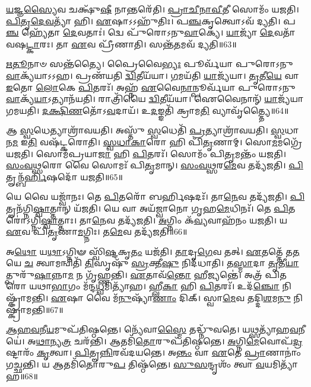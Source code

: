 \-\ul{𑌯}\-𑌜𑍍𑌞\-\ul{𑌸𑍍𑌯𑍈}\-𑌵 𑌚𑌕𑍍𑌷𑍁᳴\-\ul{𑌷𑍀} 𑌨𑌾𑌨𑍍𑌤𑌰𑍇᳴𑌤𑌿।
\-\ul{𑌪𑍍𑌰𑌾}\-\-\ul{𑌚𑍀}\-\-\ul{𑌨𑌾}\-\-\ul{𑌵𑍀}\-𑌤𑍀 𑌸𑍋𑌮𑌂᳴ 𑌯𑌜𑌤𑌿।
\-\ul{𑌪𑌿}\-\-\ul{𑌤𑍃}\-\-\ul{𑌦𑍇}\-\-\ul{𑌵}\-𑌤𑍍𑌯𑌾᳴ 𑌹𑌿।
\-\ul{𑌏}\-𑌷𑌾𑌽𑌽𑌹𑍁᳴𑌤𑌿𑌃।
𑌪\-\ul{𑌞𑍍𑌚}\-𑌕𑍃𑌤𑍍𑌵𑍋𑌽𑌵᳴ 𑌦𑍍𑌯𑌤𑌿।
𑌪\-\ul{𑌞𑍍𑌚} 𑌹𑍍𑌯𑍇᳴𑌤𑌾 \ul{𑌦𑍇}\-𑌵𑌤𑌾𑌃॑।
𑌦𑍍𑌵𑍇 𑌪𑍁᳴𑌰𑍋\-𑌽𑌨𑍁\-\ul{𑌵𑌾}\-𑌕𑍍𑌯𑍇॑।
\-\ul{𑌯𑌾}\-𑌜𑍍𑌯𑌾᳴ \ul{𑌦𑍇}\-𑌵𑌤𑌾᳴ 𑌵𑌷\-\ul{𑌟𑍍𑌕𑌾}\-𑌰𑌃।
𑌤𑌾 \ul{𑌏}\-𑌵 𑌪𑍍𑌰𑍀᳴𑌣𑌾𑌤𑌿।
𑌸𑌨𑍍𑌤᳴\-\ul{𑌤}\-𑌮𑌵᳴ 𑌦𑍍𑌯𑌤𑌿॥63॥

\-\ul{𑌋}\-\-\ul{𑌤𑍂}\-𑌨𑌾𑍞 𑌸𑌨𑍍𑌤᳴𑌤𑍍𑌯𑍈।
𑌪𑍍𑌰𑍈𑌵𑍈\-\ul{𑌭𑍍𑌯𑌃} 𑌪𑍂𑌰𑍍𑌵᳴𑌯𑌾 𑌪𑍁𑌰𑍋\-𑌽𑌨𑍁\-\ul{𑌵𑌾}\-𑌕𑍍𑌯᳴𑌯𑌾𑌽𑌽𑌹।
𑌪𑍍𑌰𑌣᳴𑌯𑌤𑌿 \ul{𑌦𑍍𑌵𑌿}\-𑌤𑍀𑌯᳴𑌯𑌾।
\-\ul{𑌗}\-𑌮𑌯᳴𑌤𑌿 \ul{𑌯𑌾}\-𑌜𑍍𑌯᳴𑌯𑌾।
\-\ul{𑌤𑍃}\-𑌤𑍀\-\ul{𑌯𑍇} 𑌵𑌾 \ul{𑌇}\-𑌤𑍋 \ul{𑌲𑍋}\-𑌕𑍇 \ul{𑌪𑌿}\-𑌤𑌰𑌃᳴।
𑌅𑌹𑍍𑌨᳴ \ul{𑌏}\-𑌵𑍈\-\ul{𑌨𑌾}\-𑌨𑍍𑌪𑍂𑌰𑍍𑌵᳴𑌯𑌾 𑌪𑍁𑌰𑍋\-𑌽𑌨𑍁\-\ul{𑌵𑌾}\-𑌕𑍍𑌯᳴\-\ul{𑌯𑌾}\-\-𑌽𑌤𑍍𑌯𑌾𑌨᳴𑌯𑌤𑌿।
𑌰𑌾𑌤𑍍𑌰𑌿᳴𑌯𑍈 \ul{𑌦𑍍𑌵𑌿}\-𑌤𑍀𑌯᳴𑌯𑌾।
𑌐𑌵𑍈𑌨𑌾𑌨𑍍᳴ \ul{𑌯𑌾}\-𑌜𑍍𑌯᳴𑌯𑌾 𑌗𑌮𑌯𑌤𑌿।
\-\ul{𑌦}\-\-\ul{𑌕𑍍𑌷𑌿}\-\-\ul{𑌣}\-𑌤𑍋᳴\-𑌽\-\ul{𑌵}\-𑌦𑌾𑌯᳴।
𑌉\-\ul{𑌦}\-𑌙𑍍𑌙𑌤𑌿᳴ 𑌕𑍍𑌰𑌾𑌮\-\ul{𑌤𑌿} 𑌵𑍍𑌯𑌾𑌵𑍃᳴𑌤𑍍𑌤𑍍𑌯𑍈॥64॥

𑌆 \ul{𑌸𑍍𑌵}\-𑌧𑍇𑌤𑍍𑌯𑌾𑌶𑍍𑌰𑌾᳴𑌵𑌯𑌤𑌿।
𑌅𑌸𑍍𑌤𑍁᳴ \ul{𑌸𑍍𑌵}\-𑌧𑍇𑌤𑌿᳴ \ul{𑌪𑍍𑌰}\-𑌤𑍍𑌯𑌾𑌶𑍍𑌰𑌾᳴𑌵𑌯𑌤𑌿।
\-\ul{𑌸𑍍𑌵}\-𑌧𑌾 𑌨\-\ul{𑌮} 𑌇\-\ul{𑌤𑌿} 𑌵𑌷᳴𑌟𑍍𑌕𑌰𑍋𑌤𑌿।
\-\ul{𑌸𑍍𑌵}\-\-\ul{𑌧𑌾}\-\-\ul{𑌕𑌾}\-𑌰𑍋 𑌹𑌿 𑌪𑌿᳴\-\ul{𑌤𑍃}\-𑌣𑌾𑌮𑍍।
𑌸𑍋\-\ul{𑌮}\-𑌮𑌗𑍍𑌰𑍇᳴ 𑌯𑌜𑌤𑌿।
𑌸𑍋𑌮᳴𑌪𑍍𑌰𑌯𑌾\-\ul{𑌜𑌾} 𑌹𑌿 \ul{𑌪𑌿}\-𑌤𑌰𑌃᳴।
𑌸𑍋𑌮𑌂᳴ 𑌪𑌿\-\ul{𑌤𑍃}\-𑌮𑌨𑍍𑌤𑌂᳴ 𑌯𑌜𑌤𑌿।
\-\ul{𑌸𑌂}\-\-\ul{𑌵}\-\-\ul{𑌥𑍍𑌸}\-𑌰𑍋 𑌵𑍈 𑌸𑍋𑌮𑌃᳴ 𑌪𑌿\-\ul{𑌤𑍃}\-𑌮𑌾𑌨𑍍।
\-\ul{𑌸𑌂}\-\-\ul{𑌵}\-\-\ul{𑌥𑍍𑌸}\-𑌰\-\ul{𑌮𑍇}\-𑌵 𑌤𑌦𑍍𑌯᳴𑌜𑌤𑌿।
\-\ul{𑌪𑌿}\-𑌤𑍄𑌨𑍍𑌬᳴\-\ul{𑌰𑍍𑌹𑌿}\-𑌷𑌦𑍋᳴ 𑌯𑌜𑌤𑌿॥65॥

𑌯𑍇 𑌵𑍈 𑌯𑌜𑍍𑌵𑌾᳴𑌨𑌃।
𑌤𑍇 \ul{𑌪𑌿}\-𑌤𑌰𑍋᳴ 𑌬𑌰𑍍\mbox{}\-\ul{𑌹𑌿}\-𑌷𑌦𑌃᳴।
𑌤𑌾\-\ul{𑌨𑍇}\-𑌵 𑌤𑌦𑍍𑌯᳴𑌜𑌤𑌿।
\-\ul{𑌪𑌿}\-𑌤𑍄𑌨᳴𑌗𑍍𑌨𑌿\-\ul{𑌷𑍍𑌵𑌾}\-𑌤𑍍𑌤𑌾𑌨𑍍 𑌯᳴𑌜𑌤𑌿।
𑌯𑍇 𑌵𑌾 𑌅𑌯᳴𑌜𑍍𑌵𑌾𑌨𑍋 𑌗𑍃𑌹\-\ul{𑌮𑍇}\-𑌧𑌿𑌨𑌃᳴।
𑌤𑍇 \ul{𑌪𑌿}\-𑌤𑌰𑍋॑\-𑌽𑌗𑍍𑌨𑌿\-\ul{𑌷𑍍𑌵𑌾}\-𑌤𑍍𑌤𑌾𑌃।
𑌤𑌾\-\ul{𑌨𑍇}\-𑌵 𑌤𑌦𑍍𑌯᳴𑌜𑌤𑌿।
\-\ul{𑌅}\-𑌗𑍍𑌨𑌿𑌂 𑌕᳴\-\ul{𑌵𑍍𑌯}\-𑌵𑌾𑌹᳴𑌨𑌂 𑌯𑌜𑌤𑌿।
𑌯 \ul{𑌏}\-𑌵 𑌪𑌿᳴\-\ul{𑌤𑍃}\-𑌣𑌾\-\ul{𑌮}\-𑌗𑍍𑌨𑌿𑌃।
𑌤\-\ul{𑌮𑍇}\-𑌵 𑌤𑌦𑍍𑌯᳴𑌜𑌤𑌿॥66॥

𑌅\-\ul{𑌥𑍋} 𑌯\-\ul{𑌥𑌾}\-\-𑌽𑌗𑍍𑌨𑌿𑍟 𑌸𑍍𑌵𑌿᳴\-\ul{𑌷𑍍𑌟}\-𑌕𑍃\-\ul{𑌤𑌂} 𑌯𑌜᳴𑌤𑌿।
\-\ul{𑌤𑌾}\-𑌦𑍃\-\ul{𑌗𑍇}\-𑌵 𑌤𑌤𑍍।
\-\ul{𑌏}\-𑌤𑌤𑍍𑌤𑍇᳴ 𑌤\-\ul{𑌤} 𑌯𑍇 \ul{𑌚} 𑌤𑍍𑌵𑌾𑌮𑌨𑍍𑌵𑌿𑌤𑌿᳴ \ul{𑌤𑌿}\-𑌸𑍃𑌷𑍁᳴ \ul{𑌸𑍍𑌰}\-𑌕𑍍𑌤𑍀\-\ul{𑌷𑍁} 𑌨𑌿𑌦᳴𑌧𑌾𑌤𑌿।
𑌤\-\ul{𑌸𑍍𑌮𑌾}\-𑌦𑌾 \ul{𑌤𑍃}\-𑌤𑍀\-\ul{𑌯𑌾}\-𑌤𑍍𑌪𑍁𑌰𑍁᳴\-\ul{𑌷𑌾}\-𑌨𑍍𑌨𑌾\-\ul{𑌮} 𑌨 𑌗𑍃᳴𑌹𑍍𑌣𑌨𑍍𑌤𑌿।
\-\ul{𑌏}\-𑌤𑌾𑌵᳴\-\ul{𑌨𑍍𑌤𑍋} 𑌹𑍀𑌜𑍍𑌯𑌨𑍍𑌤𑍇॑।
𑌅𑌤𑍍𑌰᳴ 𑌪𑌿𑌤𑌰𑍋 𑌯𑌥𑌾\-\ul{𑌭𑌾}\-𑌗𑌂 𑌮᳴𑌨𑍍𑌦\-\ul{𑌧𑍍𑌵}\-𑌮𑌿𑌤𑍍𑌯𑌾᳴𑌹।
𑌹𑍍𑌲𑍀\-\ul{𑌕𑌾} 𑌹𑌿 \ul{𑌪𑌿}\-𑌤𑌰𑌃᳴।
𑌉𑌦᳴\-\ul{𑌞𑍍𑌚𑍋} 𑌨𑌿𑌷𑍍𑌕𑍍𑌰𑌾᳴𑌮𑌨𑍍𑌤𑌿।
\-\ul{𑌏}\-𑌷𑌾 𑌵𑍈 𑌮᳴\-\ul{𑌨𑍁}\-𑌷𑍍𑌯𑌾᳴\-\ul{𑌣𑌾𑌂} 𑌦𑌿𑌕𑍍।
𑌸𑍍𑌵𑌾\-\ul{𑌮𑍇}\-𑌵 𑌤𑌦𑍍𑌦𑌿\-\ul{𑌶}\-𑌮\-\ul{𑌨𑍁} 𑌨𑌿𑌷𑍍𑌕𑍍𑌰𑌾᳴𑌮𑌨𑍍𑌤𑌿॥67॥

\-\ul{𑌆}\-\-\ul{𑌹}\-\-\ul{𑌵}\-𑌨𑍀\-\ul{𑌯}\-𑌮𑍁𑌪᳴𑌤𑌿𑌷𑍍𑌠𑌨𑍍𑌤𑍇।
𑌨𑍍𑌯𑍇᳴𑌵𑌾\-\ul{𑌸𑍍𑌮𑍈} 𑌤𑌦𑍍𑌧𑍍𑌨𑍁᳴𑌵𑌤𑍇।
𑌯\-\ul{𑌥𑍍𑌸}\-𑌤𑍍𑌯𑌾᳴𑌹\-\ul{𑌵}\-𑌨𑍀𑌯𑍇॑।
𑌅\-\ul{𑌥𑌾}\-𑌨𑍍𑌯\-\ul{𑌤𑍍𑌰} 𑌚𑌰᳴𑌨𑍍𑌤𑌿।
𑌆𑌤𑌮𑌿᳴\-\ul{𑌤𑍋}\-𑌰𑍁𑌪᳴𑌤𑌿𑌷𑍍𑌠𑌨𑍍𑌤𑍇।
\-\ul{𑌅}\-𑌗𑍍𑌨𑌿\-\ul{𑌮𑍇}\-𑌵𑍋𑌪᳴\-\ul{𑌦𑍍𑌰}\-𑌷𑍍𑌟𑌾𑌰𑌂᳴ \ul{𑌕𑍃}\-𑌤𑍍𑌵𑌾।
\-\ul{𑌪𑌿}\-𑌤𑍄\-\ul{𑌨𑍍𑌨𑌿}\-𑌰𑌵᳴𑌦𑌯𑌨𑍍𑌤𑍇।
𑌅\-\ul{𑌨𑍍𑌤𑌂} 𑌵𑌾 \ul{𑌏}\-𑌤𑍇 \ul{𑌪𑍍𑌰𑌾}\-𑌣𑌾𑌨𑌾𑌂॑ 𑌗𑌚𑍍𑌛𑌨𑍍𑌤𑌿।
𑌯 𑌆𑌤𑌮𑌿᳴𑌤𑍋𑌰𑍁\-\ul{𑌪} 𑌤𑌿𑌷𑍍𑌠᳴𑌨𑍍𑌤𑍇।
\-\ul{𑌸𑍁}\-\-\ul{𑌸}\-𑌨𑍍𑌦𑍃𑌶𑌂᳴ 𑌤𑍍𑌵𑌾 \ul{𑌵}\-𑌯𑌮𑌿𑌤𑍍𑌯𑌾᳴𑌹॥68॥

